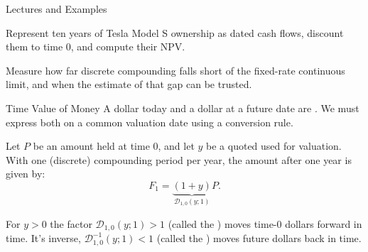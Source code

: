 \documentclass[aspectratio=169,11pt]{beamer}
\begin{document}
\begin{frame}{Lectures and Examples}
  \vspace{0.25em}
  {\normalsize\textbf{}\par
  }

  \vspace{0.8em}
  {\normalsize\textbf{}\par
  }

  \vspace{0.5em}
  Represent ten years of Tesla Model S ownership as dated cash flows, discount
  them to time $0$, and compute their NPV.

  \vspace{0.8em}
  {\normalsize\textbf{}\par
  }

  \vspace{0.5em}
  Measure how far discrete compounding falls short of the fixed-rate continuous
  limit, and when the estimate of that gap can be trusted.

\end{frame}

\begin{frame}{Time Value of Money}
  A dollar today and a dollar at a future date are . We must express both on a common
  valuation date using a conversion rule.

  \vspace{0.5em}
  Let $P$ be an amount held at time $0$, and let $y$ be a quoted
  \textbf{} used for valuation. With one (discrete) compounding
  period per year, the amount after one year is given by:
  \[
    F_1=\underbrace{(1+y)}_{\mathcal D_{1,0}(y;1)}P .
  \]

  For $y>0$ the factor $\mathcal D_{1,0}(y;1)>1$ (called the \textbf{}) moves time-0 dollars forward in time.
  It's inverse, $\mathcal D_{1,0}^{-1}(y;1)<1$ (called the \textbf{}) moves future dollars back in time.

\end{frame}
\end{document}
